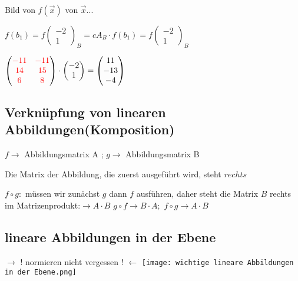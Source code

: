 \begin{multicols*}{3}
    { Bild von $f(\vec{x})$ von $\vec{x} ... $}

    {$ f(b_1) = f(\begin{matrix}
                -2 \\
                1
            \end{matrix})_B = cA_B \cdot f(b_1) = f(\begin{matrix}
                -2 \\
                1
            \end{matrix})_B$}

    {$\begin{pmatrix}
                {\color{red}-11} & {\color{red}-11} \\
                {\color{red}14}  & {\color{red}15}  \\
                {\color{red}6}   & {\color{red}8}
            \end{pmatrix} \cdot \begin{pmatrix}
                -2 \\
                1
            \end{pmatrix} = \begin{pmatrix}
                11  \\
                -13 \\
                -4
            \end{pmatrix}$}

    \vfill\null
    \columnbreak
    \subsection{  Verknüpfung von linearen Abbildungen(Komposition)
    }
    {$f \to $ Abbildungsmatrix A ; $g \to $ Abbildungsmatrix B}

    {Die Matrix der Abbildung, die zuerst ausgeführt wird, steht $rechts$}

    {$f \circ g:$ müssen wir zunächst $g$ dann $f$
        ausführen, daher steht die Matrix $B$ rechts im Matrizenprodukt:}$\to A \cdot B$
    {{$g \circ f \to B \cdot A; $  }{$f \circ g \to A \cdot B$  }}

    \subsection{ lineare Abbildungen in der Ebene}
    {$\rightarrow $ $!$ normieren nicht vergessen $!$ $\leftarrow$}
    {\texttt{[image: wichtige lineare Abbildungen in der Ebene.png]}}


\end{multicols*}
